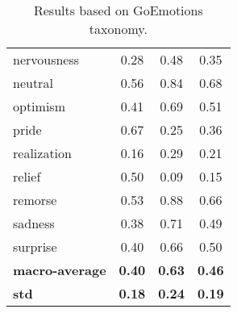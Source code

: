 \documentclass[11pt,a4paper]{article}
\begin{document}
\begin{table}[h!]
{\begin{centering}
\begin{tabular}{@{}lccc@{}}
nervousness            & 0.28               & 0.48            & 0.35          \\
neutral                & 0.56               & 0.84            & 0.68          \\
optimism               & 0.41               & 0.69            & 0.51          \\
pride                  & 0.67               & 0.25            & 0.36          \\
realization            & 0.16               & 0.29            & 0.21          \\
relief                 & 0.50               & 0.09            & 0.15          \\
remorse                & 0.53               & 0.88            & 0.66          \\
sadness                & 0.38               & 0.71            & 0.49          \\
surprise               & 0.40               & 0.66            & 0.50          \\
\textbf{macro-average} & \textbf{0.40}      & \textbf{0.63}   & \textbf{0.46} \\
\textbf{std}     & \textbf{0.18}      & \textbf{0.24}   & \textbf{0.19} \\
\bottomrule
\end{tabular}
    \end{centering}
    }
    \caption{Results based on GoEmotions taxonomy.}
    \label{tab:results}
\end{table}


\begin{table}[h!]
\centering
    
    \caption{Results based on sentiment-grouped data.}
    \label{tab:sentiment_results}
\end{table}
\end{document}
